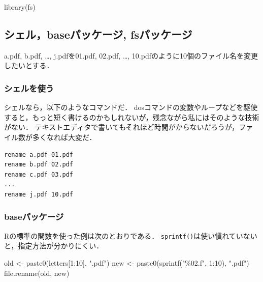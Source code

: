 \documentclass[
]{article}
\newenvironment{Shaded}{\begin{snugshade}}{\end{snugshade}}
\newcommand{\DecValTok}[1]{\textcolor[rgb]{0.00,0.00,0.81}{#1}}
\newcommand{\FunctionTok}[1]{\textcolor[rgb]{0.00,0.00,0.00}{#1}}
\newcommand{\NormalTok}[1]{#1}
\newcommand{\OtherTok}[1]{\textcolor[rgb]{0.56,0.35,0.01}{#1}}
\newcommand{\SpecialCharTok}[1]{\textcolor[rgb]{0.00,0.00,0.00}{#1}}
\newcommand{\StringTok}[1]{\textcolor[rgb]{0.31,0.60,0.02}{#1}}
\begin{document}
\begin{Shaded}
\begin{Highlighting}[]
\FunctionTok{library}\NormalTok{(fs)}
\end{Highlighting}
\end{Shaded}

\hypertarget{ux30b7ux30a7ux30ebbaseux30d1ux30c3ux30b1ux30fcux30b8-fsux30d1ux30c3ux30b1ux30fcux30b8}{%
\subsection{シェル，baseパッケージ, fsパッケージ}\label{ux30b7ux30a7ux30ebbaseux30d1ux30c3ux30b1ux30fcux30b8-fsux30d1ux30c3ux30b1ux30fcux30b8}}

a.pdf, b.pdf, \ldots, j.pdfを01.pdf, 02.pdf, \ldots, 10.pdfのように10個のファイル名を変更したいとする．

\hypertarget{ux30b7ux30a7ux30ebux3092ux4f7fux3046}{%
\subsubsection{シェルを使う}\label{ux30b7ux30a7ux30ebux3092ux4f7fux3046}}

シェルなら，以下のようなコマンドだ．
dosコマンドの変数やループなどを駆使すると，もっと短く書けるのかもしれないが，残念ながら私にはそのような技術がない．
テキストエディタで書いてもそれほど時間がからないだろうが，ファイル数が多くなれば大変だ．

\begin{verbatim}
rename a.pdf 01.pdf
rename b.pdf 02.pdf
rename c.pdf 03.pdf
...
rename j.pdf 10.pdf
\end{verbatim}

\hypertarget{baseux30d1ux30c3ux30b1ux30fcux30b8}{%
\subsubsection{baseパッケージ}\label{baseux30d1ux30c3ux30b1ux30fcux30b8}}

Rの標準の関数を使った例は次のとおりである．
\texttt{sprintf()}は使い慣れていないと，指定方法が分かりにくい．

\begin{Shaded}
\begin{Highlighting}[]
\NormalTok{old }\OtherTok{\textless{}{-}} \FunctionTok{paste0}\NormalTok{(letters[}\DecValTok{1}\SpecialCharTok{:}\DecValTok{10}\NormalTok{], }\StringTok{".pdf"}\NormalTok{)}
\NormalTok{new }\OtherTok{\textless{}{-}} \FunctionTok{paste0}\NormalTok{(}\FunctionTok{sprintf}\NormalTok{(}\StringTok{"\%02.f"}\NormalTok{, }\DecValTok{1}\SpecialCharTok{:}\DecValTok{10}\NormalTok{), }\StringTok{".pdf"}\NormalTok{)}
\FunctionTok{file.rename}\NormalTok{(old, new)}
\end{Highlighting}
\end{Shaded}
\end{document}
